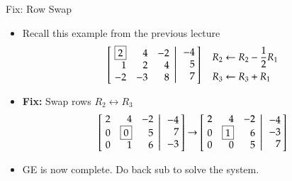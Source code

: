 \documentclass[10pt]{beamer}
\begin{document}
\begin{frame}{Fix: Row Swap}

\begin{itemize}
        \item Recall this example from the previous lecture
\begin{equation*}
    \left[
           \left.\negthickspace\begin{array}{rrrr}  \boxed{2} &  4 & -2  \\
                                                    1 &  2 &  4  \\
                                                   -2 & -3 &  8  \end{array}
           \right|\begin{array}{r} -4 \\  5 \\ 7  \end{array}\negthickspace\right]
           \quad \begin{aligned}
                       &R_2 \leftarrow R_2 -\frac{1}{2}R_1 \\
         &R_3 \leftarrow R_3 + R_1 
           \end{aligned}
\end{equation*}

    \item \textbf{Fix:} Swap rows $R_2 \leftrightarrow R_3$
        \begin{equation*}
        \left[\left.\negthickspace\begin{array}{rrrr}  2 &  4 & -2 \\
                                                        0 &  \boxed{0} &  5 \\
                                                        0 &  1 &  6  \end{array}
               \right|\begin{array}{r} -4 \\ 7 \\ -3 \end{array}\negthickspace\right]
        \rightarrow
        \left[\left.\negthickspace\begin{array}{rrrr}  2 &  4 & -2 \\
                                                        0 &  \boxed{1} &  6\\  
                                                        0 &  0 &  5 \\
                                                        \end{array}
               \right|\begin{array}{r} -4 \\ -3 \\ 7 \end{array}\negthickspace\right]
    \end{equation*}
    \item GE is now complete. Do back sub to solve the system.
    \end{itemize}
    
\end{frame}
\end{document}
